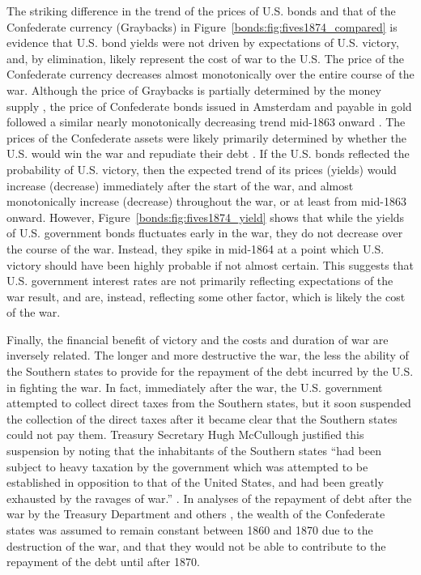 The striking difference in the trend of the prices of U.S. bonds and that of the Confederate currency (Graybacks) in Figure~\ref{bonds:fig:fives1874_compared} is evidence that U.S. bond yields were not driven by expectations of U.S. victory, and, by elimination, likely represent the cost of war to the U.S.
The price of the Confederate currency decreases almost monotonically over the entire course of the war.
Although the price of Graybacks is partially determined by the money supply \parencite{BurdekinWeidenmier2001}, the price of Confederate bonds issued in Amsterdam and payable in gold followed a similar nearly monotonically decreasing trend mid-1863 onward \parencite{HaberMitchenerOosterlinckEtAl2015}.
The prices of the Confederate assets were likely primarily determined by whether the U.S. would win the war and repudiate their debt \parencite{HaberMitchenerOosterlinckEtAl2015}.
If the U.S. bonds reflected the probability of U.S. victory, then the expected trend of its prices (yields) would increase (decrease) immediately after the start of the war, and almost monotonically increase (decrease) throughout the war, or at least from mid-1863 onward.
However, Figure~\ref{bonds:fig:fives1874_yield} shows that while the yields of U.S. government bonds fluctuates early in the war, they do not decrease over the course of the war.
Instead, they spike in mid-1864 at a point which U.S. victory should have been highly probable if not almost certain.
This suggests that U.S. government interest rates are not primarily reflecting expectations of the war result, and are, instead, reflecting some other factor, which is likely the cost of the war.

Finally, the financial benefit of victory and the costs and duration of war are inversely related.
The longer and more destructive the war, the less the ability of the Southern states to provide for the repayment of the debt incurred by the U.S. in fighting the war.
In fact, immediately after the war, the U.S. government attempted to collect direct taxes from the Southern states, but it soon suspended the collection of the direct taxes after it became clear that the Southern states could not pay them.
Treasury Secretary Hugh McCullough justified this suspension by noting that the inhabitants of the Southern states ``had been subject to heavy taxation by the government which was attempted to be established in opposition to that of the United States, and had been greatly exhausted by the ravages of war.'' \parencite[29]{Treasury1865}.
In analyses of the repayment of debt after the war by the Treasury Department and others \parencites{Elder1865}{Treasury1865}{Walker1865a}, the wealth of the Confederate states was assumed to remain constant between 1860 and 1870 due to the destruction of the war, and that they would not be able to contribute to the repayment of the debt until after 1870.

